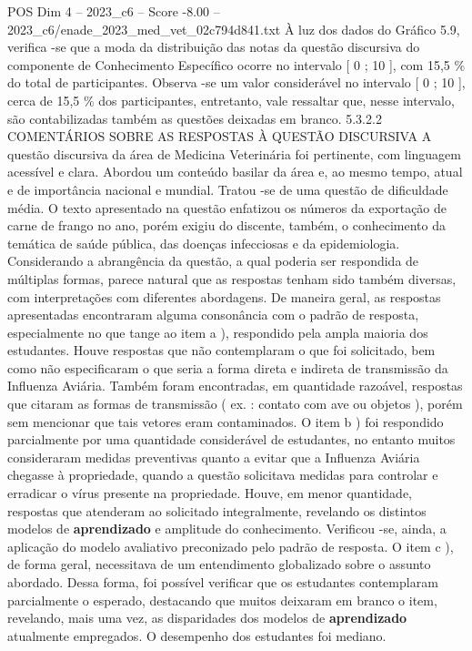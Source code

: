\begin{textsample}{POS Dim 4 – 2023\_c6 – Score -8.00 – 2023\_c6/enade\_2023\_med\_vet\_02c794d841.txt}
À luz dos dados do Gráfico 5.9, verifica -se que a moda da distribuição das notas da questão discursiva do componente de Conhecimento Específico ocorre no intervalo [ 0 ; 10 ], com 15,5 \% do total de participantes.
Observa -se um valor considerável no intervalo [ 0 ; 10 ], cerca de 15,5 \% dos participantes, entretanto, vale ressaltar que, nesse intervalo, são contabilizadas também as questões deixadas em branco. 5.3.2.2 COMENTÁRIOS SOBRE AS RESPOSTAS À QUESTÃO DISCURSIVA A questão discursiva da área de Medicina Veterinária foi pertinente, com linguagem acessível e clara.
Abordou um conteúdo basilar da área e, ao mesmo tempo, atual e de importância nacional e mundial.
Tratou -se de uma questão de dificuldade média.
O texto apresentado na questão enfatizou os números da exportação de carne de frango no ano, porém exigiu do discente, também, o conhecimento da temática de saúde pública, das doenças infecciosas e da epidemiologia.
Considerando a abrangência da questão, a qual poderia ser respondida de múltiplas formas, parece natural que as respostas tenham sido também diversas, com interpretações com diferentes abordagens.
De maneira geral, as respostas apresentadas encontraram alguma consonância com o padrão de resposta, especialmente no que tange ao item a ), respondido pela ampla maioria dos estudantes.
Houve respostas que não contemplaram o que foi solicitado, bem como não especificaram o que seria a forma direta e indireta de transmissão da Influenza Aviária.
Também foram encontradas, em quantidade razoável, respostas que citaram as formas de transmissão ( ex. : contato com ave ou objetos ), porém sem mencionar que tais vetores eram contaminados.
O item b ) foi respondido parcialmente por uma quantidade considerável de estudantes, no entanto muitos consideraram medidas preventivas quanto a evitar que a Influenza Aviária chegasse à propriedade, quando a questão solicitava medidas para controlar e erradicar o vírus presente na propriedade.
Houve, em menor quantidade, respostas que atenderam ao solicitado integralmente, revelando os distintos modelos de \textbf{aprendizado} e amplitude do conhecimento.
Verificou -se, ainda, a aplicação do modelo avaliativo preconizado pelo padrão de resposta.
O item c ), de forma geral, necessitava de um entendimento globalizado sobre o assunto abordado.
Dessa forma, foi possível verificar que os estudantes contemplaram parcialmente o esperado, destacando que muitos deixaram em branco o item, revelando, mais uma vez, as disparidades dos modelos de \textbf{aprendizado} atualmente empregados.
O desempenho dos estudantes foi mediano.

\end{textsample}
